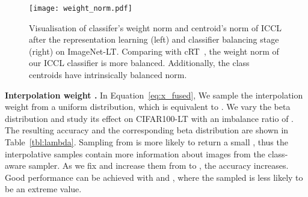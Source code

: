 \begin{table}[!t]
		\setlength\tabcolsep{4pt}
	\centering
    \vspace{-1ex}
	\caption
		{\small	
		Adjustment parameter  of the interpolative branch class-aware sampler.
		Focus excessively on head-class (uniform) or tail-class samples ()
		leads to worse performance.
		}
	\label{tbl:second_sampler_choice}
\vspace{-2.5ex}
\end{table}		


 \begin{figure*}[!t]

	\centering
	\texttt{[image: weight\_norm.pdf]}
    \vspace{-2ex}
  \caption
  	{ \small
	Visualisation of classifer's weight norm and centroid's norm of ICCL after the representation learning (left) and classifier balancing stage (right) on ImageNet-LT. Comparing with cRT~\cite{decouple-longtail}, the weight norm of our ICCL classifier is more balanced. Additionally, the class centroids have intrinsically balanced norm.
	  } 
  \label{fig:weight_norm1}
   \vspace{-2.5ex}
 \end{figure*} 
 \textbf{Interpolation weight .}
In Equation~\ref{eq:x_fused},
We sample the interpolation weight  from a uniform distribution,
which is equivalent to .
We vary the beta distribution and study its effect on CIFAR100-LT with an imbalance ratio of . 
The resulting accuracy and the corresponding beta distribution are shown in Table~\ref{tbl:lambda}.
Sampling from  is more likely to return a small , thus the interpolative samples 
contain more information about images from the class-aware sampler.
As we fix  and increase them from  to ,
the accuracy increases. 
Good performance can be achieved with  and ,
where the sampled  is less likely to be an extreme value.

